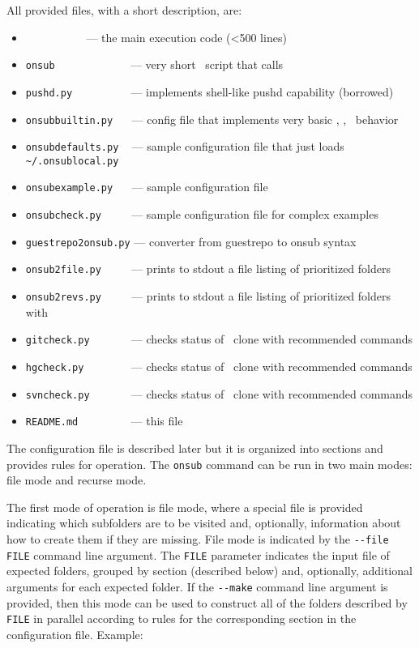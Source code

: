 All provided files, with a short description, are:
\begin{itemize}
\item \onsubpy\ ~~~~~~~~~ --- the main execution code (<500 lines)
\item \lstinline{onsub} ~~~~~~~~~~~~ --- very short \Python\ script that calls \onsubpy\
\item \lstinline{pushd.py} ~~~~~~~~~ --- implements shell-like pushd capability (borrowed)
\item \lstinline{onsubbuiltin.py} ~~ --- config file that implements very basic \hg, \git, \svn\ behavior
\item \lstinline{onsubdefaults.py} ~ --- sample configuration file that just loads \lstinline{~/.onsublocal.py}
\item \lstinline{onsubexample.py} ~~ --- sample configuration file
\item \lstinline{onsubcheck.py} ~~~~ --- sample configuration file for complex examples
\item \lstinline{guestrepo2onsub.py} --- converter from guestrepo to onsub syntax
\item \lstinline{onsub2file.py} ~~~~ --- prints to stdout a file listing of prioritized folders
\item \lstinline{onsub2revs.py} ~~~~ --- prints to stdout a file listing of prioritized folders with
\item \lstinline{gitcheck.py} ~~~~~~ --- checks status of \git\ clone with recommended commands
\item \lstinline{hgcheck.py} ~~~~~~~ --- checks status of \hg\ clone with recommended commands
\item \lstinline{svncheck.py} ~~~~~~ --- checks status of \svn\ clone with recommended commands
\item \lstinline{README.md} ~~~~~~~~ --- this file
\end{itemize}

The configuration file is described later but it is organized into sections and provides rules for operation. The \lstinline{onsub} command can be run in two main modes: file mode and recurse mode.

The first mode of operation is file mode, where a special file is provided indicating which subfolders are to be visited and, optionally, information about how to create them if they are missing. File mode is indicated by the \lstinline{--file FILE} command line argument. The \lstinline{FILE} parameter indicates the input file of expected folders, grouped by section (described below) and, optionally, additional arguments for each expected folder. If the \lstinline{--make} command line argument is provided, then this mode can be used to construct all of the folders described by \lstinline{FILE} in parallel according to rules for the corresponding section in the configuration file.  Example:

